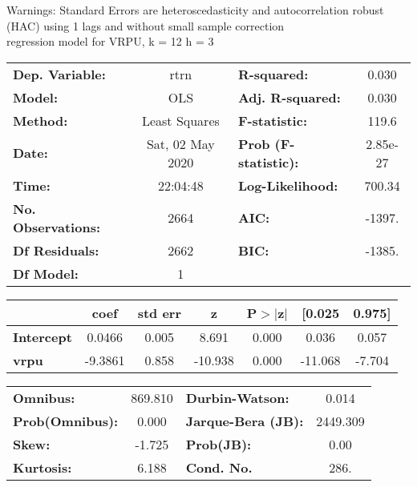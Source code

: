Warnings: \newline
 [1] Standard Errors are heteroscedasticity and autocorrelation robust (HAC) using 1 lags and without small sample correction\\ 

regression model for VRPU, k = 12 h = 3\begin{center}
\begin{tabular}{lclc}
\toprule
\textbf{Dep. Variable:}    &       rtrn       & \textbf{  R-squared:         } &     0.030   \\
\textbf{Model:}            &       OLS        & \textbf{  Adj. R-squared:    } &     0.030   \\
\textbf{Method:}           &  Least Squares   & \textbf{  F-statistic:       } &     119.6   \\
\textbf{Date:}             & Sat, 02 May 2020 & \textbf{  Prob (F-statistic):} &  2.85e-27   \\
\textbf{Time:}             &     22:04:48     & \textbf{  Log-Likelihood:    } &    700.34   \\
\textbf{No. Observations:} &        2664      & \textbf{  AIC:               } &    -1397.   \\
\textbf{Df Residuals:}     &        2662      & \textbf{  BIC:               } &    -1385.   \\
\textbf{Df Model:}         &           1      & \textbf{                     } &             \\
\bottomrule
\end{tabular}
\begin{tabular}{lcccccc}
                   & \textbf{coef} & \textbf{std err} & \textbf{z} & \textbf{P$> |$z$|$} & \textbf{[0.025} & \textbf{0.975]}  \\
\midrule
\textbf{Intercept} &       0.0466  &        0.005     &     8.691  &         0.000        &        0.036    &        0.057     \\
\textbf{vrpu}      &      -9.3861  &        0.858     &   -10.938  &         0.000        &      -11.068    &       -7.704     \\
\bottomrule
\end{tabular}
\begin{tabular}{lclc}
\textbf{Omnibus:}       & 869.810 & \textbf{  Durbin-Watson:     } &    0.014  \\
\textbf{Prob(Omnibus):} &   0.000 & \textbf{  Jarque-Bera (JB):  } & 2449.309  \\
\textbf{Skew:}          &  -1.725 & \textbf{  Prob(JB):          } &     0.00  \\
\textbf{Kurtosis:}      &   6.188 & \textbf{  Cond. No.          } &     286.  \\
\bottomrule
\end{tabular}
\end{center}

